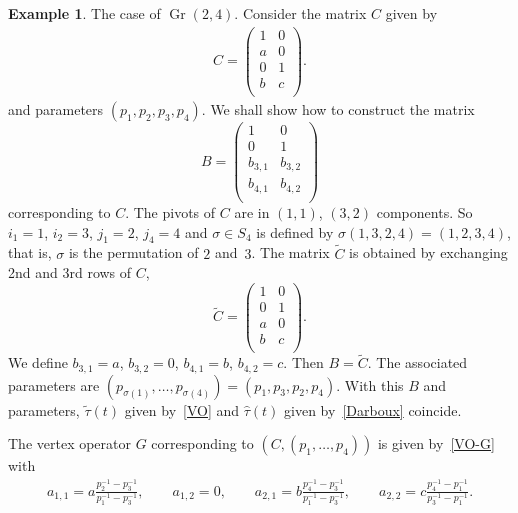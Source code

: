 \documentclass[10pt,a4paper]{amsart}
\numberwithin{equation}{section}
\theoremstyle{definition}
\newtheorem{Example}[Theorem]{Example}
\begin{document}
\begin{Example}\label{example-gr24} The case of $\operatorname{Gr}(2,4)$.
Consider the matrix $C$ given by
\begin{gather}
 C=\left(
 \begin{matrix}
 1&0\\
 a&0\\
 0&1\\
 b&c\\
 \end{matrix}
 \right).
 \label{C-example}
 \end{gather}
 and parameters $(p_1,p_2,p_3,p_4)$.
 We shall show how to construct the matrix
\[
 B=\left(
 \begin{matrix}
 1&0\\
 0&1\\
 b_{3,1}&b_{3,2}\\
 b_{4,1}&b_{4,2}\\
 \end{matrix}
 \right)
 \label{B-example}
 \]
 corresponding to $C$.
 The pivots of $C$ are in $(1,1)$, $(3,2)$ components. So $i_1=1$, $i_2=3$, $j_1=2$, $j_4=4$ and $\sigma\in S_4$ is defined by $\sigma(1,3,2,4)=(1,2,3,4)$, that is, $\sigma$ is the permutation of $2$ and~$3$. The matrix $\tilde{C}$ is obtained by exchanging
 2nd and 3rd rows of $C$,
 \[
 \tilde{C}=\left(
 \begin{matrix}
 1&0\\
 0&1\\
 a&0\\
 b&c\\
 \end{matrix}
 \right).
 \label{C-tilde-example}
 \]
 We define $b_{3,1}=a$, $b_{3,2}=0$, $b_{4,1}=b$, $b_{4,2}=c$. Then $B=\tilde{C}$.
 The associated parameters are $(p_{\sigma(1)},\dots ,p_{\sigma(4)})=(p_1,p_3,p_2,p_4)$.
 With this $B$ and parameters, $\tilde{\tau}(t)$ given by~\eqref{VO} and
 $\widehat{\tau}(t)$ given by~\eqref{Darboux} coincide.

 The vertex operator $G$ corresponding to $(C,(p_1,\dots ,p_4))$ is given by~\eqref{VO-G} with
 \begin{gather*}
 a_{1,1}=a\frac{p_2^{-1}-p_3^{-1}}{p_1^{-1}-p_3^{-1}},
 \qquad
 a_{1,2}=0,
\qquad
 a_{2,1}=b\frac{p_4^{-1}-p_3^{-1}}{p_1^{-1}-p_3^{-1}},
 \qquad
 a_{2,2}=c\frac{p_4^{-1}-p_1^{-1}}{p_3^{-1}-p_1^{-1}}.
 \end{gather*}
 \end{Example}
\end{document}
